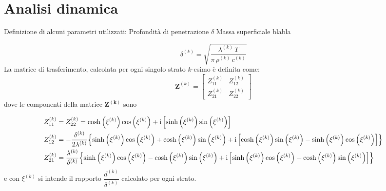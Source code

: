 \chapter{Analisi dinamica}

Definizione di alcuni parametri utilizzati:
Profondità di penetrazione $\delta$ 
Massa superficiale
blabla



\begin{equation}
    \delta^{(k)} = \sqrt{\frac{\lambda^{(k)} \, T}{\pi \,\rho^{(k)} \,c^{(k)}}}
\end{equation}
La matrice di trasferimento, calcolata per ogni singolo strato $k$-esimo è definita come:
\begin{equation}
    \mathbf{Z}^{(k)} =
    \begin{bmatrix}  
        Z_{11}^{(k)} & Z_{12}^{(k)} \\
        Z_{21}^{(k)} & Z_{22}^{(k)}
    \end{bmatrix}
\end{equation}
dove le componenti della matrice $\mathbf{Z^{(k)}}$ sono

{\footnotesize
\begin{align*}
    Z_{11}^{(k)} &= Z_{22}^{(k)} = \cosh\left(\xi^{(k)}\right)\cos\left(\xi^{(k)}\right) + \mathrm{i} \left[\sinh\left(\xi^{(k)}\right)\sin\left(\xi^{(k)}\right)\right] \\
    Z_{12}^{(k)} &=-\frac{\delta^{(k)}}{2\lambda^{(k)}}\Bigl\{\sinh\left(\xi^{(k)}\right)\cos\left(\xi^{(k)}\right)+\cosh\left(\xi^{(k)}\right)\sin\left(\xi^{(k)}\right) + \mathrm{i}\left[\cosh\left(\xi^{(k)}\right)\sin\left(\xi^{(k)}\right)-\sinh\left(\xi^{(k)}\right)\cos\left(\xi^{(k)}\right)\right]  \Bigr\} \\
    Z_{21}^{(k)} &= \frac{\lambda^{(k)}}{\delta^{(k)}}\Bigl\{  \sinh\left(\xi^{(k)}\right)\cos\left(\xi^{(k)}\right)-\cosh\left(\xi^{(k)}\right)\sin\left(\xi^{(k)}\right) + \mathrm{i} \left[\sinh\left(\xi^{(k)}\right)\cos\left(\xi^{(k)}\right)+\cosh\left(\xi^{(k)}\right)\sin\left(\xi^{(k)}\right)\right] \Bigr\}
\end{align*}
}%
e con $\xi^{(k)}$ si intende il rapporto $\dfrac{d^{(k)}}{\delta^{(k)}}$ calcolato per ogni strato.

